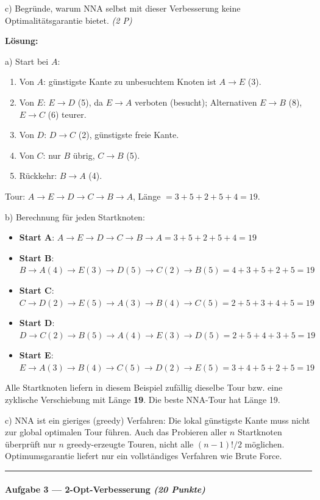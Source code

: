\documentclass[11pt, a4paper]{article}
\begin{document}
c) Begründe, warum NNA selbst mit dieser Verbesserung keine Optimalitätsgarantie bietet. \textit{(2 P)}


\textbf{Lösung:}


a) Start bei $A$:

\begin{enumerate}
  \item Von $A$: günstigste Kante zu unbesuchtem Knoten ist $A\to E$ (3).
  \item Von $E$: $E\to D$ (5), da $E\to A$ verboten (besucht); Alternativen $E\to B$ (8), $E\to C$ (6) teurer.
  \item Von $D$: $D\to C$ (2), günstigste freie Kante.
  \item Von $C$: nur $B$ übrig, $C\to B$ (5).
  \item Rückkehr: $B\to A$ (4).
\end{enumerate}

Tour: $A\to E\to D\to C\to B\to A$, Länge $= 3+5+2+5+4 = 19$.


b) Berechnung für jeden Startknoten:


\begin{itemize}
  \item \textbf{Start A}: $A\to E\to D\to C\to B\to A = 3+5+2+5+4 = 19$
  \item \textbf{Start B}: $B\to A(4)\to E(3)\to D(5)\to C(2)\to B(5) = 4+3+5+2+5 = 19$
  \item \textbf{Start C}: $C\to D(2)\to E(5)\to A(3)\to B(4)\to C(5) = 2+5+3+4+5 = 19$
  \item \textbf{Start D}: $D\to C(2)\to B(5)\to A(4)\to E(3)\to D(5) = 2+5+4+3+5 = 19$
  \item \textbf{Start E}: $E\to A(3)\to B(4)\to C(5)\to D(2)\to E(5) = 3+4+5+2+5 = 19$
\end{itemize}

Alle Startknoten liefern in diesem Beispiel zufällig dieselbe Tour bzw. eine zyklische Verschiebung mit Länge \textbf{19}. Die beste NNA-Tour hat Länge 19.


c) NNA ist ein gieriges (greedy) Verfahren: Die lokal günstigste Kante muss nicht zur global optimalen Tour führen. Auch das Probieren aller $n$ Startknoten überprüft nur $n$ greedy-erzeugte Touren, nicht alle $(n-1)!/2$ möglichen. Optimumsgarantie liefert nur ein vollständiges Verfahren wie Brute Force.



\noindent\textcolor{rulegray}{\rule{\linewidth}{0.4pt}}


\paragraph{Aufgabe 3 — 2-Opt-Verbesserung \textit{(20 Punkte)}}\mbox{}\\[2pt]
\end{document}
